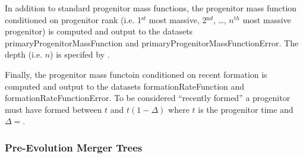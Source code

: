 In addition to standard progenitor mass functions, the progenitor mass function conditioned on progenitor rank (i.e. 1$^{\mathrm st}$ most massive, 2$^{\mathrm nd}$, \ldots, $n^{\mathrm th}$ most massive progenitor) is computed and output to the datasets {\normalfont \ttfamily primaryProgenitorMassFunction} and {\normalfont \ttfamily primaryProgenitorMassFunctionError}. The depth (i.e. $n$) is specifed by {\normalfont \ttfamily [mergerTreeComputeConditionalMassFunctionPrimaryProgenitorDepth]}.

Finally, the progenitor mass functoin conditioned on recent formation is computed and output to the datasets {\normalfont \ttfamily formationRateFunction} and {\normalfont \ttfamily formationRateFunctionError}. To be considered ``recently formed'' a progenitor must have formed between $t$ and $t(1-\Delta)$ where $t$ is the progenitor time and $\Delta=${\normalfont \ttfamily [mergerTreeConditionalMassFunctionFormationRateTimeFraction]}.

\subsubsection{Pre-Evolution Merger Trees}


